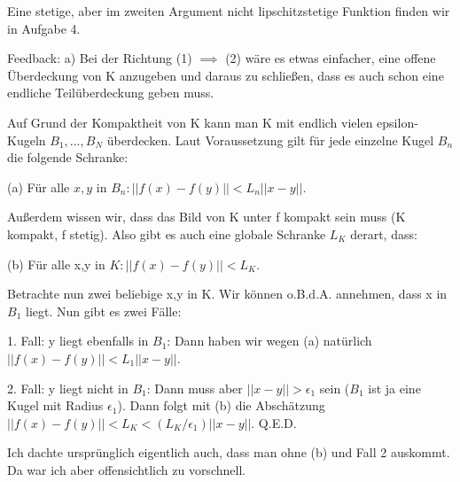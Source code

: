 \begin{solution}
\begin{enumerate}[label = \alph*)]
    Eine stetige, aber im zweiten Argument nicht lipschitzstetige Funktion finden wir in Aufgabe 4.
  \end{enumerate}

Feedback:
a) Bei der Richtung (1) $\implies$ (2) wäre es etwas einfacher, eine offene Überdeckung von K anzugeben und daraus zu schließen, dass es auch schon eine endliche Teilüberdeckung geben muss.

Auf Grund der Kompaktheit von K kann man K mit endlich vielen epsilon-Kugeln $B_1,...,B_N$ überdecken. Laut Voraussetzung gilt für jede einzelne Kugel $B_n$ die folgende Schranke:

(a) Für alle $x,y$ in $B_n: ||f(x)-f(y)|| < L_n ||x-y||$.

Außerdem wissen wir, dass das Bild von K unter f kompakt sein muss (K kompakt, f stetig). Also gibt es auch eine globale Schranke $L_K$ derart, dass:

(b) Für alle x,y in $K: ||f(x)-f(y)|| < L_K$.

Betrachte nun zwei beliebige x,y in K. Wir können o.B.d.A. annehmen, dass x in $B_1$ liegt. Nun gibt es zwei Fälle:

1. Fall: y liegt ebenfalls in $B_1$: Dann haben wir wegen (a) natürlich $||f(x)-f(y)|| < L_1 ||x-y||$.

2. Fall: y liegt nicht in $B_1$: Dann muss aber $||x-y|| > \epsilon_1$ sein ($B_1$ ist ja eine Kugel mit Radius $\epsilon_1$). Dann folgt mit (b) die Abschätzung $||f(x)-f(y)|| < L_K < (L_K / \epsilon_1) ||x-y||$. Q.E.D.

Ich dachte ursprünglich eigentlich auch, dass man ohne (b) und Fall 2 auskommt. Da war ich aber offensichtlich zu vorschnell.

\end{solution}
